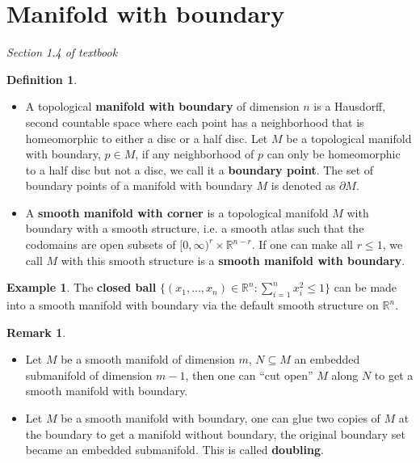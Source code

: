 \documentclass{article}
\theoremstyle{definition}
\newtheorem{dfn}[thm]{Definition}
\newtheorem{rmk}[thm]{Remark}
\newtheorem{exm}[thm]{Example}
\begin{document}
\section{Manifold with boundary}

{\em Section 1.4 of textbook}

\begin{dfn}\label{mwb}
    \begin{itemize}
        \item A topological {\bf manifold with boundary} of dimension $n$ is a Hausdorff, second countable space where each point has a neighborhood that is homeomorphic to either a disc or a half disc. Let $M$ be a topological manifold with boundary, $p\in M$, if any neighborhood of $p$ can only be homeomorphic to a half disc but not a disc, we call it a {\bf boundary point}. The set of boundary points of a manifold with boundary $M$ is denoted as $\partial M$.
        \item A {\bf smooth manifold with corner} is a topological manifold $M$ with boundary with a smooth structure, i.e. a smooth atlas such that the codomains are open subsets of $[0, \infty)^r\times\mathbb{R}^{n-r}$. If one can make all $r\leq 1$, we call $M$ with this smooth structure is a {\bf smooth manifold with boundary}.
    \end{itemize}
\end{dfn}

\begin{exm}
    The {\bf closed ball} $\{(x_1, \dots, x_n)\in\mathbb{R}^n:\sum_{i=1}^n x_i^2\leq 1\}$ can be made into a smooth manifold with boundary via the default smooth structure on $\mathbb{R}^n$.
\end{exm}

\begin{rmk}
    \begin{itemize}
        \item Let $M$ be a smooth manifold of dimension $m$, $N\subseteq M$ an embedded submanifold of dimension $m-1$, then one can ``cut open'' $M$ along $N$ to get a smooth manifold with boundary.
        \item Let $M$ be a smooth manifold with boundary, one can glue two copies of $M$ at the boundary to get a manifold without boundary, the original boundary set became an embedded submanifold. This is called {\bf doubling}.
    \end{itemize}
\end{rmk}

\newpage
\end{document}
